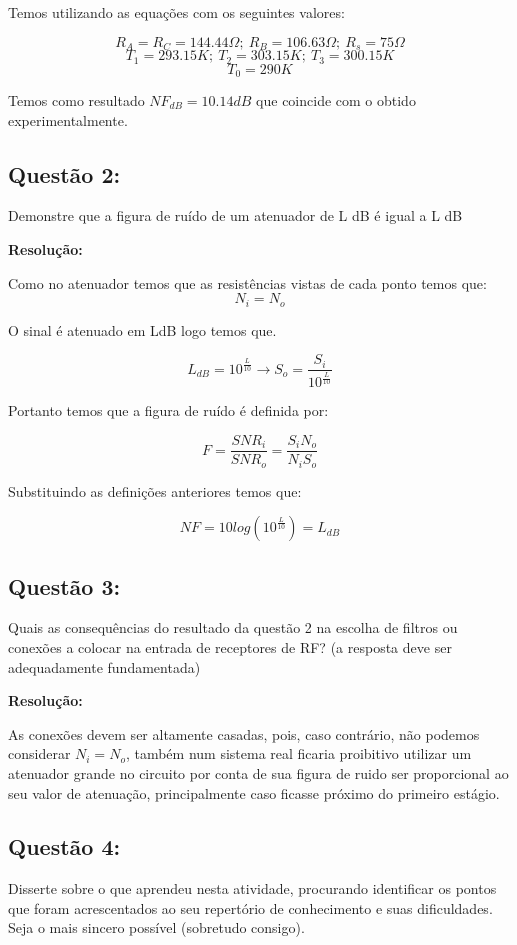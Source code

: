 \documentclass[a4paper,12pt]{proc}
\begin{document}
\noindent Temos utilizando as equações com os seguintes valores:

\[R_{A}=R_{C} = 144.44 \Omega ;~R_{B} = 106.63 \Omega; ~ R_{s} = 75 \Omega \]
\[T_{1} = 293.15K; ~ T_{2} = 303.15K; ~   T_{3} = 300.15K\]
\[T_{0} = 290K \]

\noindent Temos como resultado $NF_{dB} = 10.14dB$ que coincide com o obtido experimentalmente.

\subsection{Questão 2:}
Demonstre que a figura de ruído de um atenuador de L dB é igual a L dB
\singlespacing

\textbf{Resolução:}

\singlespacing

\noindent Como no atenuador temos que as resistências vistas de cada ponto temos que:
\[N_{i} = N_{o}\]

\noindent O sinal é atenuado em LdB logo temos que.

\[L_{dB} = 10^{\frac{L}{10}} \rightarrow  S_{o} = \frac{S_{i}}{10^{\frac{L}{10}}}\]

\noindent Portanto temos que a figura de ruído é definida por:

\[F = \frac{SNR_{i}}{SNR_{o}} = \frac{S_{i}N_{o}}{N_{i}S_{o}} \]

\noindent Substituindo as definições anteriores temos que:

\[NF = 10log(10^{\frac{L}{10}}) = L_{dB}\]


\subsection{Questão 3:}
Quais as consequências do resultado da questão 2 na escolha de filtros ou conexões a colocar na entrada de receptores de
RF? (a resposta deve ser adequadamente fundamentada)
\singlespacing

\textbf{Resolução:}

\singlespacing

\noindent As conexões devem ser altamente casadas, pois, caso contrário, não podemos considerar $N_{i}=N_{o}$, também num sistema real ficaria proibitivo utilizar um atenuador grande no circuito por conta de sua figura de ruido ser proporcional ao seu valor de atenuação, principalmente caso ficasse próximo do primeiro estágio.

\subsection{Questão 4:}
Disserte sobre o que aprendeu nesta atividade, procurando identificar os pontos que foram acrescentados ao seu repertório
de conhecimento e suas dificuldades. Seja o mais sincero possível (sobretudo consigo).
\singlespacing
\end{document}
